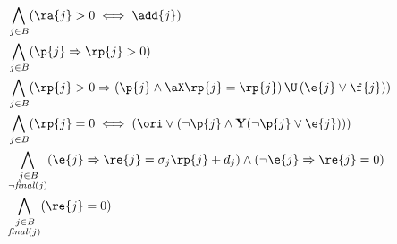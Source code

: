\begin{align*}
& \bigwedge_{
\begin{subarray}{c}
\,j \in B
\end{subarray}
} ( \ra{j} > 0 \iff \add{j}) \\
%
%
%
%
%
& \bigwedge_{
\begin{subarray}{c}
\,j \in B
\end{subarray}
} ( \p{j} \Rightarrow \rp{j} > 0 ) \\
%
%
%
& \bigwedge_{
\begin{subarray}{c}
\,j \in B
\end{subarray}
} ( \rp{j} > 0 \Rightarrow (\p{j} \land \aX \rp{j}=\rp{j}) \, \U \, (\e{j}\lor \f{j})) \\
%
%
%
& \bigwedge_{
\begin{subarray}{c}
\,j \in B
\end{subarray}
} ( \rp{j} = 0 \iff (\ori \lor (\neg\p{j} \land  \mathbf{Y}(\neg\p{j} \lor \e{j}) )) \\
%
%
%
%
& \bigwedge_{
\begin{subarray}{c}
\,j \in B\\
\lnot \mathit{final}(j)
\end{subarray}
} ( \e{j} \Rightarrow \re{j} = \sigma_j \rp{j} + d_j ) \land (\lnot \e{j} \Rightarrow \re{j} = 0 )\\
%
%
& \bigwedge_{
\begin{subarray}{c}
\,j \in B\\
\mathit{final}(j)
\end{subarray}
} ( \re{j} = 0) 
%
%
%
\end{align*}

